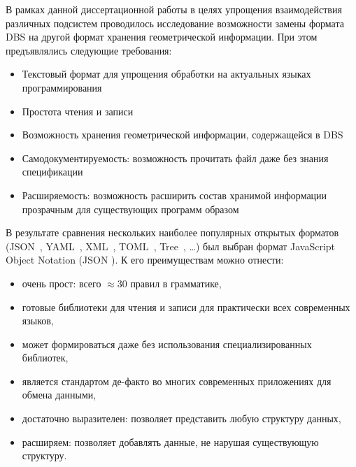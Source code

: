 В рамках данной диссертационной работы
в целях упрощения взаимодействия различных подсистем
проводилось исследование возможности замены
формата DBS
на другой формат хранения геометрической информации.
При этом предъявлялись следующие требования:
\begin{itemize}
  \item Текстовый формат для упрощения обработки на актуальных языках программирования
  \item Простота чтения и записи
  \item Возможность хранения геометрической информации, содержащейся в DBS
  \item Самодокументируемость:
  возможность прочитать файл даже без знания спецификации
  \item Расширяемость:
  возможность расширить состав хранимой информации прозрачным для существующих программ образом
\end{itemize}

В результате сравнения нескольких
наиболее популярных открытых форматов
(JSON~\cite{bi:JSON},
YAML~\cite{bi:YAML},
XML~\cite{bi:XML},
TOML~\cite{bi:TOML},
Tree~\cite{bi:tree.d},
\dots)
был выбран формат
JavaScript Object Notation
(JSON
\cite{bi:JSON}).
К его преимуществам можно отнести:
\begin{itemize}
  \item очень прост:
  всего $\approx 30$ правил в грамматике,
  \item готовые библиотеки для чтения и записи
  для практически всех современных языков,
  \item может формироваться даже
  без использования специализированных библиотек,
  \item является стандартом де-факто во многих
  современных приложениях для обмена данными,
  \item достаточно выразителен:
  позволяет представить любую структуру данных,
  \item расширяем:
  позволяет добавлять данные,
  не нарушая существующую структуру.
\end{itemize}

